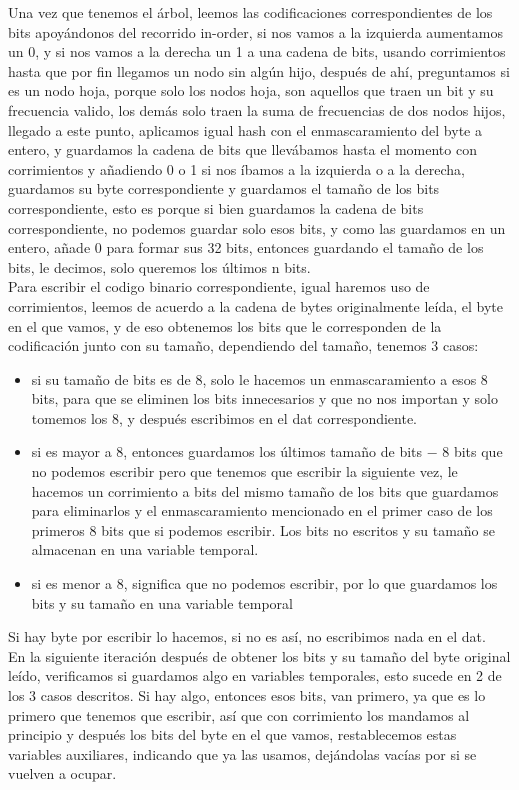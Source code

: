 \documentclass[12 pt]{report}
\begin{document}
Una vez que tenemos el árbol, leemos las codificaciones correspondientes de los bits apoyándonos del recorrido in-order, si nos vamos a la izquierda aumentamos un 0, y si nos vamos a la derecha un 1 a una cadena de bits, usando corrimientos hasta que por fin llegamos un nodo sin algún hijo, después de ahí, preguntamos si es un nodo hoja, porque solo los nodos hoja, son aquellos que traen un bit y su frecuencia valido, los demás solo traen la suma de frecuencias de dos nodos hijos, llegado a este punto, aplicamos igual hash con el enmascaramiento del byte a entero, y guardamos la cadena de bits que llevábamos hasta el momento con corrimientos y añadiendo 0 o 1 si nos íbamos a la izquierda o a la derecha, guardamos su byte correspondiente y guardamos el tamaño de los bits correspondiente, esto es porque si bien guardamos la cadena de bits correspondiente, no podemos guardar solo esos bits, y como las guardamos en un entero, añade 0 para formar sus 32 bits, entonces guardando el tamaño de los bits, le decimos, solo queremos los últimos n bits.\\
Para escribir el codigo binario correspondiente, igual haremos uso de corrimientos, leemos de acuerdo a la cadena de bytes originalmente leída, el byte en el que vamos, y de eso obtenemos los bits que le corresponden de la codificación junto con su tamaño, dependiendo del tamaño, tenemos 3 casos:
\begin{itemize}
\item si su tamaño de bits es de 8, solo le hacemos un enmascaramiento a esos 8 bits, para que se eliminen los bits innecesarios y que no nos importan y solo tomemos los 8, y después escribimos en el dat correspondiente.
\item si es mayor a 8, entonces guardamos los últimos tamaño de bits $-$ 8 bits que no podemos escribir pero que tenemos que escribir la siguiente vez, le hacemos un corrimiento a bits del mismo tamaño de los bits que guardamos para eliminarlos y el enmascaramiento mencionado en el primer caso de los primeros 8 bits que si podemos escribir. Los bits no escritos y su tamaño se almacenan en una variable temporal.
\item si es menor a 8, significa que no podemos escribir, por lo que guardamos los bits y su tamaño en una variable temporal
\end{itemize}
Si hay byte por escribir lo hacemos, si no es así, no escribimos nada en el dat.\\
En la siguiente iteración después de obtener los bits y su tamaño del byte original leído, verificamos si guardamos algo en variables temporales, esto sucede en 2 de los 3 casos descritos. Si hay algo, entonces esos bits, van primero, ya que es lo primero que tenemos que escribir, así que con corrimiento los mandamos al principio y después los bits del byte en el que vamos, restablecemos estas variables auxiliares, indicando que ya las usamos, dejándolas vacías por si se vuelven a ocupar.\\
\end{document}
